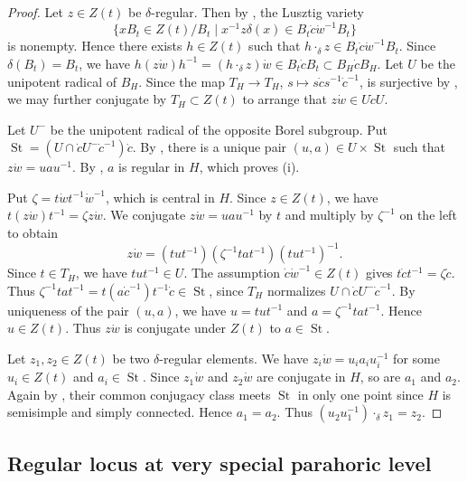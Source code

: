\documentclass[12pt]{article}
\theoremstyle{definition}
\begin{document}
\begin{proof}
Let $z\in Z(t)$ be $\delta$-regular. Then by \cite[\S5.5(a)]{HeALV}, the Lusztig variety
$$
\{xB_t\in Z(t)/B_t\mid x^{-1}z\delta(x)\in B_t\dot c\dot w^{-1}B_t\}
$$
is nonempty.
Hence there exists $h\in Z(t)$ such that $h\cdot_\delta z\in B_t\dot c\dot w^{-1}B_t$.
Since $\delta(B_t)=B_t$, we have $h(z\dot w)h^{-1}=(h\cdot_\delta z)\dot w\in B_t\dot c B_t\subset B_H\dot c B_H$.
Let $U$ be the unipotent radical of $B_H$. Since the map $T_H\to T_H$, $s\mapsto s\dot c s^{-1}\dot c^{-1}$, is surjective by \cite[Lemma 7.6]{Steinberg65}, we may further conjugate by $T_H\subset Z(t)$ to arrange that $z\dot w\in U\dot cU$.

Let $U^-$ be the unipotent radical of the opposite Borel subgroup. Put $\operatorname{St}=(U\cap\dot cU^-\dot c^{-1})\dot c$.
By \cite[Proposition 8.9]{Steinberg65}, there is a unique pair $(u,a)\in U\times\operatorname{St}$ such that $z\dot w=uau^{-1}$.
By \cite[Theorem 1.4]{Steinberg65}, $a$ is regular in $H$, which proves (i).

Put $\zeta=t\dot w t^{-1}\dot w^{-1}$, which is central in $H$. Since $z\in Z(t)$, we have $t(z\dot w)t^{-1}=\zeta z\dot w$. We conjugate $z\dot w=uau^{-1}$ by $t$ and multiply by $\zeta^{-1}$ on the left to obtain
$$
z\dot w=(tut^{-1})(\zeta^{-1}tat^{-1})(tut^{-1})^{-1}.
$$
Since $t\in T_H$, we have $tut^{-1}\in U$. The assumption $\dot c\dot w^{-1}\in Z(t)$ gives $t\dot c t^{-1}=\zeta\dot c$.
Thus $\zeta^{-1}tat^{-1}=t(a\dot c^{-1})t^{-1}\dot c\in\operatorname{St}$, since $T_H$ normalizes $U\cap\dot cU^-\dot c^{-1}$. By uniqueness of the pair $(u,a)$, we have $u=tut^{-1}$ and $a=\zeta^{-1}tat^{-1}$. Hence $u\in Z(t)$. Thus $z\dot w$ is conjugate under $Z(t)$ to $a\in\operatorname{St}$.

Let $z_1,z_2\in Z(t)$ be two $\delta$-regular elements. We have $z_i\dot w=u_ia_iu_i^{-1}$ for some $u_i\in Z(t)$ and $a_i\in\operatorname{St}$.
Since $z_1\dot w$ and $z_2\dot w$ are conjugate in $H$, so are $a_1$ and $a_2$.
Again by \cite[Theorem 1.4]{Steinberg65}, their common conjugacy class meets $\operatorname{St}$ in only one point since $H$ is semisimple and simply connected. Hence $a_1=a_2$.
Thus $(u_2u_1^{-1})\cdot_\delta z_1=z_2$.
\end{proof}

\subsection{Regular locus at very special parahoric level}
\label{parahoric-subsection}
\end{document}
